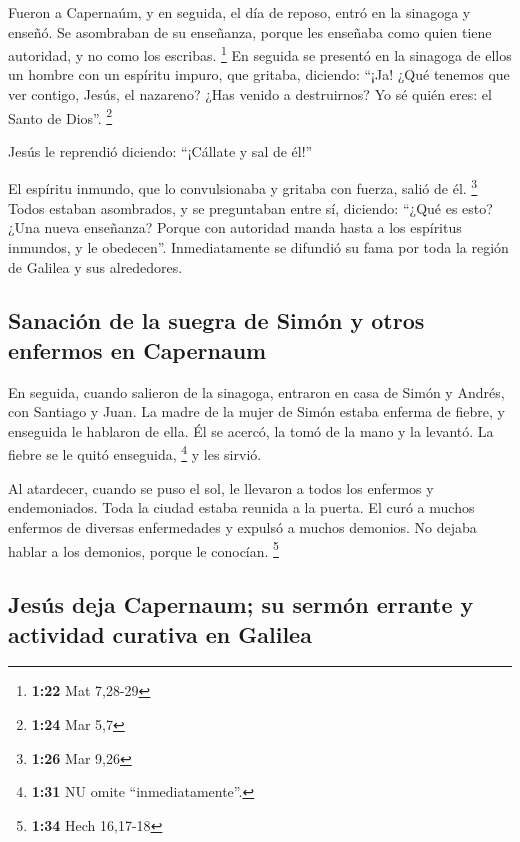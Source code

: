 \begin{paracol}{2}
 Fueron a Capernaúm, y en seguida, el día de reposo,
entró en la sinagoga y enseñó.  Se asombraban de su
enseñanza, porque les enseñaba como quien tiene autoridad, y no como los
escribas. \footnote{\textbf{1:22} Mat 7,28-29}  En
seguida se presentó en la sinagoga de ellos un hombre con un espíritu
impuro, que gritaba,  diciendo: ``¡Ja! ¿Qué tenemos que
ver contigo, Jesús, el nazareno? ¿Has venido a destruirnos? Yo sé quién
eres: el Santo de Dios''. \footnote{\textbf{1:24} Mar 5,7}

 Jesús le reprendió diciendo: ``¡Cállate y sal de él!''

 El espíritu inmundo, que lo convulsionaba y gritaba con
fuerza, salió de él. \footnote{\textbf{1:26} Mar 9,26} 
Todos estaban asombrados, y se preguntaban entre sí, diciendo: ``¿Qué es
esto? ¿Una nueva enseñanza? Porque con autoridad manda hasta a los
espíritus inmundos, y le obedecen''.  Inmediatamente se
difundió su fama por toda la región de Galilea y sus alrededores.

\hypertarget{sanaciuxf3n-de-la-suegra-de-simuxf3n-y-otros-enfermos-en-capernaum}{%
\subsection{Sanación de la suegra de Simón y otros enfermos en
Capernaum}\label{sanaciuxf3n-de-la-suegra-de-simuxf3n-y-otros-enfermos-en-capernaum}}

 En seguida, cuando salieron de la sinagoga, entraron en
casa de Simón y Andrés, con Santiago y Juan.  La madre de
la mujer de Simón estaba enferma de fiebre, y enseguida le hablaron de
ella.  Él se acercó, la tomó de la mano y la levantó. La
fiebre se le quitó enseguida, \footnote{\textbf{1:31} NU omite
  ``inmediatamente''.} y les sirvió.

 Al atardecer, cuando se puso el sol, le llevaron a todos
los enfermos y endemoniados.  Toda la ciudad estaba
reunida a la puerta.  El curó a muchos enfermos de
diversas enfermedades y expulsó a muchos demonios. No dejaba hablar a
los demonios, porque le conocían. \footnote{\textbf{1:34} Hech 16,17-18}

\hypertarget{jesuxfas-deja-capernaum-su-sermuxf3n-errante-y-actividad-curativa-en-galilea}{%
\subsection{Jesús deja Capernaum; su sermón errante y actividad curativa
en
Galilea}\label{jesuxfas-deja-capernaum-su-sermuxf3n-errante-y-actividad-curativa-en-galilea}}


\end{paracol}
